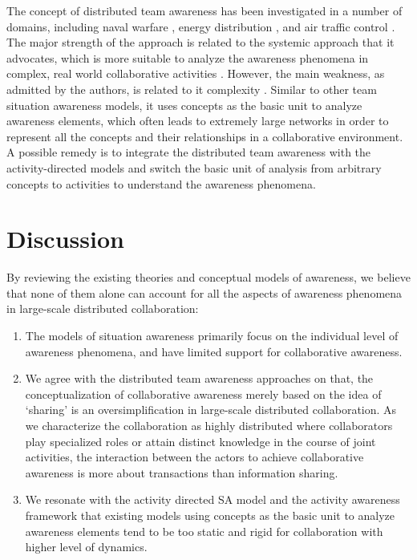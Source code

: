 The concept of distributed team awareness has been investigated in a number of domains, including naval warfare \cite{Stanton2006}, energy distribution \cite{Salmon2008a}, and air traffic control \cite{Stanton2009}. The major strength of the approach is related to the systemic approach that it advocates, which is more suitable to analyze the awareness phenomena in complex, real world collaborative activities \cite{Stanton2009}. However, the main weakness, as admitted by the authors, is related to it complexity \cite{Salmon2010}. Similar to other team situation awareness models, it uses concepts as the basic unit to analyze awareness elements, which often leads to extremely large networks in order to represent all the concepts and their relationships in a collaborative environment. A possible remedy is to integrate the distributed team awareness with the activity-directed models and switch the basic unit of analysis from arbitrary concepts to activities to understand the awareness phenomena.

\section{Discussion} %
\label{sec:discussion}
By reviewing the existing theories and conceptual models of awareness, we believe that none of them alone can account for all the aspects of awareness phenomena in large-scale distributed collaboration:

\begin{enumerate}
   \item The models of situation awareness primarily focus on the individual level of awareness phenomena, and have limited support for collaborative awareness. 
   \item We agree with the distributed team awareness approaches \cite{Salmon2010} on that, the conceptualization of collaborative awareness merely based on the idea of `sharing' is an oversimplification in large-scale distributed collaboration. As we characterize the collaboration as highly distributed where collaborators play specialized roles or attain distinct knowledge in the course of joint activities, the interaction between the actors to achieve collaborative awareness is more about transactions than information sharing.
   \item We resonate with the activity directed SA model \cite{Bedny1999} and the activity awareness framework \cite{carroll2003a} that existing models using concepts as the basic unit to analyze awareness elements tend to be too static and rigid for collaboration with higher level of dynamics.
\end{enumerate}

